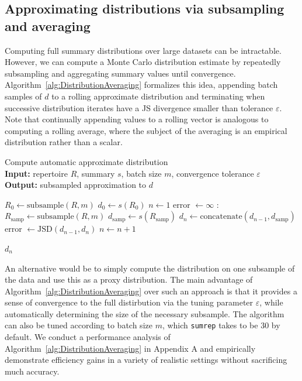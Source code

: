 \documentclass{article}
\begin{document}
\subsection*{Approximating distributions via subsampling and averaging}
Computing full summary distributions over large datasets can be intractable.
However, we can compute a Monte Carlo distribution estimate by repeatedly subsampling and aggregating summary values until convergence.
Algorithm~\ref{alg:DistributionAveraging} formalizes this idea, appending batch samples of $d$ to a rolling approximate distribution and terminating when successive distribution iterates have a JS divergence smaller than tolerance $\varepsilon$.
Note that continually appending values to a rolling vector is analogous to computing a rolling average, where the subject of the averaging is an empirical distribution rather than a scalar.
\begin{algorithm}
    \caption{Compute automatic approximate distribution \\
        \textbf{Input:} repertoire $R$, summary $s$, batch size $m$, convergence tolerance $\varepsilon$\\
        \textbf{Output:} subsampled approximation to $d$}
    \label{alg:DistributionAveraging}
    \begin{algorithmic}
        \State $R_0 \gets \text{subsample}(R, m)$
        \State $d_0 \gets s(R_0)$
        \State $n \gets 1$
        \State error $\gets \infty$
        :
        \State $R_\text{samp} \gets \text{subsample}(R, m)$
        \State $d_\text{samp} \gets s(R_\text{samp})$
        \State $d_n \gets \text{concatenate}(d_{n-1}, d_\text{samp})$
        \State error $\gets \text{JSD}(d_{n-1}, d_n)$
        \State $n \gets n + 1$
        \EndWhile
    \end{algorithmic}
    \Return $d_n$
\end{algorithm}

An alternative would be to simply compute the distribution on one subsample of the data and use this as a proxy distribution.
The main advantage of Algorithm~\ref{alg:DistributionAveraging} over such an approach is that it provides a sense of convergence to the full distirbution via the tuning parameter $\varepsilon$, while automatically determining the size of the necessary subsample.
The algorithm can also be tuned according to batch size $m$, which \texttt{sumrep} takes to be 30 by default.
We conduct a performance analysis of Algorithm~\ref{alg:DistributionAveraging} in Appendix A and empirically demonstrate efficiency gains in a variety of realistic settings without sacrificing much accuracy.
\end{document}
